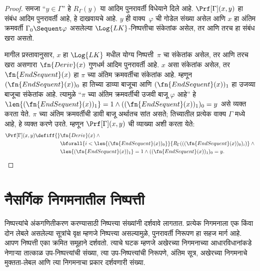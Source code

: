 \begin{proof}
समजा ``$y \in \Gamma$'' हे $R_\Gamma(y)$ या आदिम पुनरावर्ती
विधेयाने दिले आहे. $\Prf[\Gamma](x, y)$ हा संबंध आदिम पुनरावर्ती आहे,
हे दाखवायचे आहे. $y$ ही वाक्य~$\varphi$ ची गोडेल संख्या असेल
आणि $x$ हा अंतिम क्रमवर्ती $\Gamma_0 \Sequent \varphi$ असलेल्या
$\Log{LK}$-निष्पत्तीचा संकेतांक असेल, तर आणि तरच हा संबंध खरा असतो.

मागील प्रस्तावानुसार, $x$ हा $\Log{LK}$ मधील योग्य
निष्पत्ती~$\pi$ चा संकेतांक असेल, तर आणि तरच खरा असणारा
$\fn{Deriv}(x)$ गुणधर्म आदिम पुनरावर्ती आहे. $x$ असा संकेतांक असेल,
तर $\fn{EndSequent}(x)$ हा $\pi$ च्या अंतिम क्रमवर्तीचा संकेतांक आहे.
म्हणून $(\fn{EndSequent}(x))_0$ हा तिच्या डाव्या बाजूचा आणि
$(\fn{EndSequent}(x))_1$ हा उजव्या बाजूचा संकेतांक आहे. त्यामुळे
``$\pi$ च्या अंतिम क्रमवर्तीची उजवी बाजू $\varphi$ आहे'' हे
$\len{(\fn{EndSequent}(x))_1} = 1 \land ((\fn{EndSequent}(x))_1)_0 =
y$ असे व्यक्त करता येते. $\pi$ च्या अंतिम क्रमवर्तीची डावी बाजू
अर्थातच सांत असते; तिच्यातील प्रत्येक वाक्य $\Gamma$ मध्ये आहे,
हे व्यक्त करणे उरते. म्हणून $\Prf[\Gamma](x, y)$ ची व्याख्या अशी करता येते:
\begin{align*}
\Prf[\Gamma](x, y) \defiff {}&
\fn{Deriv}(x) \land {} \\
& \bforall{i <
  \len{(\fn{EndSequent}(x))_0}}{R_\Gamma(((\fn{EndSequent}(x))_0)_i)} \land {}\\
& \len{(\fn{EndSequent}(x))_1} = 1 \land ((\fn{EndSequent}(x))_1)_0 = y.
\end{align*}
\end{proof}











\section{नैसर्गिक निगमनातील निष्पत्ती}\label{inc:art:pnd:sec}

\begin{explain}
निष्पत्त्यांचे अंकगणितीकरण करण्यासाठी निष्पत्त्या संख्यांनी
दर्शवावे लागतात. प्रत्येक निगमनाला एक किंवा दोन लेबले असलेल्या
सूत्रांचे वृक्ष म्हणजे निष्पत्त्या असल्यामुळे, पुनरावर्ती
निरूपण हा सहज मार्ग आहे. आपण निष्पत्ती एका क्रमित समूहाने दर्शवतो.
त्याचे घटक म्हणजे अखेरच्या निगमनाच्या आधारविधानांकडे नेणाऱ्या तात्काळ
उप-निष्पत्त्यांची संख्या, त्या उप-निष्पत्त्यांची निरूपणे,
अंतिम सूत्र, अखेरच्या निगमनाचे मुक्तता-लेबल आणि त्या निगमनाचा
प्रकार दर्शवणारी संख्या.
\end{explain}

